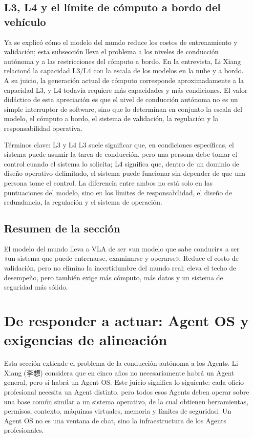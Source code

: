 \documentclass[a4paper]{article}
\begin{document}
\subsection{L3, L4 y el límite de cómputo a bordo del vehículo}

Ya se explicó cómo el modelo del mundo reduce los costos de entrenamiento y validación; esta subsección lleva el problema a los niveles de conducción autónoma y a las restricciones del cómputo a bordo. En la entrevista, Li Xiang relacionó la capacidad L3/L4 con la escala de los modelos en la nube y a bordo. A su juicio, la generación actual de cómputo corresponde aproximadamente a la capacidad L3, y L4 todavía requiere más capacidades y más condiciones. El valor didáctico de esta apreciación es que el nivel de conducción autónoma no es un simple interruptor de software, sino que lo determinan en conjunto la escala del modelo, el cómputo a bordo, el sistema de validación, la regulación y la responsabilidad operativa.

\begin{knowledgebox}{Términos clave: L3 y L4}
L3 suele significar que, en condiciones específicas, el sistema puede asumir la tarea de conducción, pero una persona debe tomar el control cuando el sistema lo solicita; L4 significa que, dentro de un dominio de diseño operativo delimitado, el sistema puede funcionar sin depender de que una persona tome el control. La diferencia entre ambos no está solo en las puntuaciones del modelo, sino en los límites de responsabilidad, el diseño de redundancia, la regulación y el sistema de operación.
\end{knowledgebox}

\subsection{Resumen de la sección}

El modelo del mundo lleva a VLA de ser «un modelo que sabe conducir» a ser «un sistema que puede entrenarse, examinarse y operarse». Reduce el costo de validación, pero no elimina la incertidumbre del mundo real; eleva el techo de desempeño, pero también exige más cómputo, más datos y un sistema de seguridad más sólido.
\section{De responder a actuar: Agent OS y exigencias de alineación}

Esta sección extiende el problema de la conducción autónoma a los Agents. Li Xiang (李想) considera que en cinco años no necesariamente habrá un Agent general, pero sí habrá un Agent OS. Este juicio significa lo siguiente: cada oficio profesional necesita un Agent distinto, pero todos esos Agents deben operar sobre una base común similar a un sistema operativo, de la cual obtienen herramientas, permisos, contexto, máquinas virtuales, memoria y límites de seguridad. Un Agent OS no es una ventana de chat, sino la infraestructura de los Agents profesionales.
\end{document}
